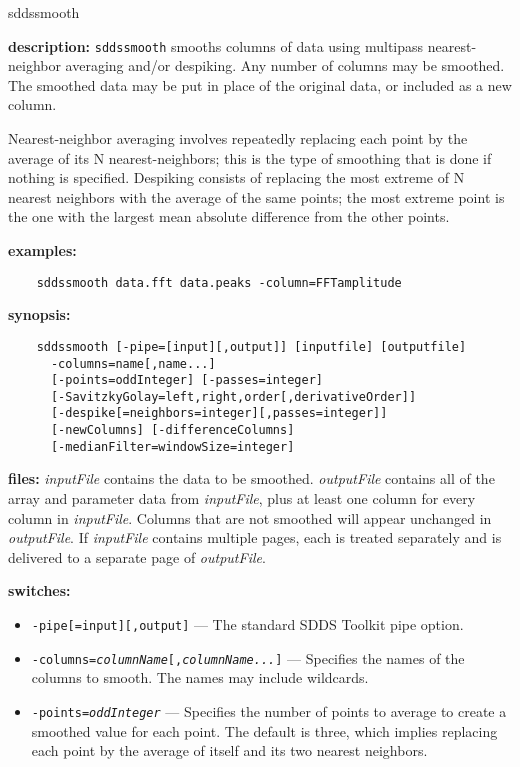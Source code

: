 \begin{sddsprog}{sddssmooth}
  \item \textbf{description:} {\tt sddssmooth} smooths columns of data using multipass nearest-neighbor averaging and/or despiking. Any number of columns may be smoothed. The smoothed data may be put in place of the original data, or included as a new column.

  Nearest-neighbor averaging involves repeatedly replacing each point by the average of its N nearest-neighbors; this is the type of smoothing that is done if nothing is specified. Despiking consists of replacing the most extreme of N nearest neighbors with the average of the same points; the most extreme point is the one with the largest mean absolute difference from the other points.
  \item \textbf{examples:}
    \begin{verbatim}
    sddssmooth data.fft data.peaks -column=FFTamplitude
    \end{verbatim}
  \item \textbf{synopsis:}
    \begin{verbatim}
    sddssmooth [-pipe=[input][,output]] [inputfile] [outputfile]
      -columns=name[,name...]
      [-points=oddInteger] [-passes=integer]
      [-SavitzkyGolay=left,right,order[,derivativeOrder]]
      [-despike[=neighbors=integer][,passes=integer]]
      [-newColumns] [-differenceColumns]
      [-medianFilter=windowSize=integer]
    \end{verbatim}
  \item \textbf{files:}
    \emph{inputFile} contains the data to be smoothed. \emph{outputFile} contains all of the array and parameter data from \emph{inputFile}, plus at least one column for every column in \emph{inputFile}. Columns that are not smoothed will appear unchanged in \emph{outputFile}. If \emph{inputFile} contains multiple pages, each is treated separately and is delivered to a separate page of \emph{outputFile}.
  \item \textbf{switches:}
    \begin{itemize}
      \item \verb|-pipe[=input][,output]| --- The standard SDDS Toolkit pipe option.
      \item {\tt -columns={\em columnName}[,{\em columnName...}]} --- Specifies the names of the columns to smooth. The names may include wildcards.
      \item {\tt -points={\em oddInteger}} --- Specifies the number of points to average to create a smoothed value for each point. The default is three, which implies replacing each point by the average of itself and its two nearest neighbors.

\end{itemize}
\end{sddsprog}

